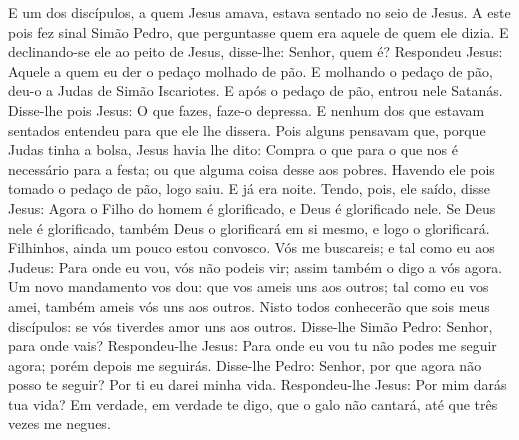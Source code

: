 {E um dos discípulos, a quem Jesus amava, estava sentado
{} no seio de Jesus.
A este pois fez sinal Simão Pedro, que perguntasse quem era aquele de quem ele dizia.
E declinando-se ele ao peito de Jesus, disse-lhe: Senhor, quem é?
Respondeu Jesus: Aquele a quem eu der o pedaço molhado de pão. E molhando o pedaço de pão, deu-o a Judas de Simão Iscariotes.
E após o pedaço de pão, entrou nele Satanás. Disse-lhe pois Jesus: O que fazes, faze-o depressa.
E nenhum dos que estavam sentados
{} entendeu para que ele lhe dissera.
Pois alguns pensavam que, porque Judas tinha a bolsa, Jesus havia lhe dito: Compra o que para o que nos é necessário para a festa; ou que alguma coisa desse aos pobres.
Havendo ele pois tomado o pedaço de pão, logo saiu. E já era noite.
Tendo, pois, ele saído, disse Jesus: Agora o Filho do homem é glorificado, e Deus é glorificado nele.
Se Deus nele é glorificado, também Deus o glorificará em si mesmo, e logo o glorificará.
Filhinhos, ainda um pouco estou convosco. Vós me buscareis; e tal como eu aos Judeus: Para onde eu vou, vós não podeis vir; assim também o digo a vós agora.
Um novo mandamento vos dou: que vos ameis uns aos outros; tal como eu vos amei, também ameis vós uns aos outros.
Nisto todos conhecerão que sois meus discípulos: se vós tiverdes amor uns aos outros.
Disse-lhe Simão Pedro: Senhor, para onde vais? Respondeu-lhe Jesus: Para onde eu vou tu não podes me seguir agora; porém depois me seguirás.
Disse-lhe Pedro: Senhor, por que agora não posso te seguir? Por ti eu darei minha vida.
Respondeu-lhe Jesus: Por mim darás tua vida? Em verdade, em verdade te digo, que o galo não cantará, até que três vezes me negues.

}
